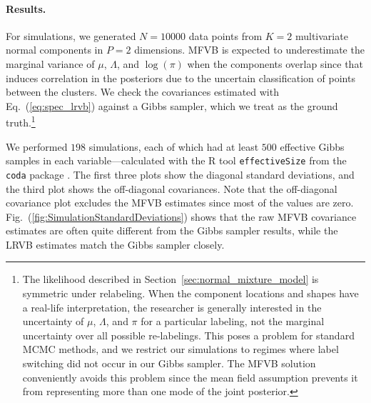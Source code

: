 \documentclass{article}\usepackage[]{graphicx}\usepackage[]{color}
\newcommand{\mysec}[1]{Section~\ref{sec:#1}}
\newcommand{\eq}[1]{Eq.~(\ref{eq:#1})}
\newcommand{\fig}[1]{Fig.~(\ref{fig:#1})}
\theoremstyle{plain}
\begin{document}
%
\newcommand{\MNISTn}{12665}
\newcommand{\MNISTTestN}{2115}
\newcommand{\MNISTp}{25}
\newcommand{\MNISTTestAccuracy}{0.92}
\newcommand{\MNISTTestError}{0.08}

%

%
\newcommand{\GMMeffsizecutoff}{500}
\newcommand{\GMMsimulationsize}{198}
\newcommand{\GMMsimulationn}{10000}
\newcommand{\GMMsimulationp}{2}
\newcommand{\GMMsimulationk}{2}
\newcommand{\GMMsimulationvbtime}{2.82}
\newcommand{\GMMsimulationgibbstime}{444.44}


\paragraph{Results.} %

For simulations, we generated $N=\GMMsimulationn$ data points from
$K=\GMMsimulationk$ multivariate normal components in
$P=\GMMsimulationp$ dimensions.  MFVB is expected
to underestimate the marginal variance of $\mu$, $\Lambda$, and $\log(\pi)$
when the components overlap since that induces correlation in the
posteriors due to the uncertain classification of points between the
clusters. We check the covariances estimated with
\eq{spec_lrvb} against a Gibbs sampler, which we treat as the ground
truth.\footnote{The likelihood described in \mysec{normal_mixture_model} is symmetric under
relabeling.  When the component locations and shapes have
a real-life interpretation, the researcher is generally
interested in the uncertainty of $\mu$, $\Lambda$, and $\pi$ for a
particular labeling, not the
marginal uncertainty over all possible re-labelings.  This poses
a problem for standard MCMC methods, and we restrict our simulations
to regimes where label switching did not occur in our Gibbs sampler.
The MFVB solution conveniently avoids this problem since the mean field
assumption prevents it from representing more than one mode of the
joint posterior.}

We performed $\GMMsimulationsize$ simulations, each of which had
at least $\GMMeffsizecutoff$ effective Gibbs
samples in each variable---calculated with the R tool \texttt{effectiveSize}
from the \texttt{coda} package \citep{rpackage:coda}.
The first three plots show the diagonal standard deviations,
and the third plot shows the off-diagonal covariances.  Note
that the off-diagonal covariance plot excludes the MFVB estimates since most
of the values are zero.
%
\fig{SimulationStandardDeviations} shows that the
raw MFVB covariance estimates are often quite different from the
Gibbs sampler results, while the LRVB estimates match
the Gibbs sampler closely.
\end{document}
